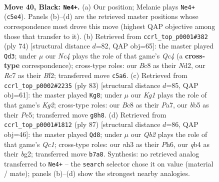 \documentclass[11pt]{article}
\begin{document}
\clearpage

\begin{figure}[p]\centering
\begin{subfigure}{0.46\textwidth}\centering
\resizebox{\linewidth}{!}{%
\newchessgame
\chessboard[
  setfen={2b3k1/1qr2p1p/6p1/1Bn1Pp2/pQ3P2/7N/P1P2KPP/1R6 b - - 17 40},
  showmover=false,
  pgfstyle=straightmove, color=movearrow, markmove={c5-e4}
]}
\caption{}
\end{subfigure}\hfill
\begin{subfigure}{0.46\textwidth}\centering
\resizebox{\linewidth}{!}{%
\newchessgame
\chessboard[
  setfen={6k1/3q1p2/p2brnp1/1p6/2QR4/P1P3P1/1P1N1BKP/8 w - - 0 38},
  showmover=false,
  pgfstyle=straightmove, color=movearrow, markmove={c4-d3}
]}
\caption{}
\end{subfigure}
\\[4pt]
\begin{subfigure}{0.46\textwidth}\centering
\resizebox{\linewidth}{!}{%
\newchessgame
\chessboard[
  setfen={8/p5k1/3qr1pp/2pNp3/1pPnR3/1P5P/P4PP1/4Q2K b - - 1 42},
  showmover=false,
  pgfstyle=straightmove, color=movearrow, markmove={g7-g8}
]}
\caption{}
\end{subfigure}\hfill
\begin{subfigure}{0.46\textwidth}\centering
\resizebox{\linewidth}{!}{%
\newchessgame
\chessboard[
  setfen={1rq3k1/5pp1/2p1b2p/R1Qn4/1p1P3P/1P4P1/3B1PB1/6K1 b - - 11 44},
  showmover=false,
  pgfstyle=straightmove, color=movearrow, markmove={c8-d8}
]}
\caption{}
\end{subfigure}
\caption{\textbf{Move 40, Black: \texttt{Ne4+}.} (a) Our position; Melanie plays \texttt{Ne4+} (\texttt{c5e4}). Panels (b)--(d) are the retrieved master positions whose correspondence most drove this move (highest QAP objective among those that transfer to it). (b) Retrieved from \texttt{ccrl\_top\_p0001\#382} (ply 74) [structural distance $d$=82, QAP obj=65]: the master played \texttt{Qd3}; under $\mu$ our \emph{Nc4} plays the role of that game's \emph{Qc4} (a \textbf{cross-type} correspondence); cross-type roles: our \emph{B}c8 as their \emph{N}d2, our \emph{R}c7 as their \emph{B}f2; transferred move \texttt{c5a6}. (c) Retrieved from \texttt{ccrl\_top\_p0002\#2235} (ply 83) [structural distance $d$=85, QAP obj=61]: the master played \texttt{Kg8}; under $\mu$ our \emph{Kg1} plays the role of that game's \emph{Kg2}; cross-type roles: our \emph{B}c8 as their \emph{P}a7, our \emph{b}b5 as their \emph{P}e5; transferred move \texttt{g8h8}. (d) Retrieved from \texttt{ccrl\_top\_p0001\#1812} (ply 87) [structural distance $d$=86, QAP obj=46]: the master played \texttt{Qd8}; under $\mu$ our \emph{Qb2} plays the role of that game's \emph{Qc1}; cross-type roles: our \emph{n}h3 as their \emph{P}h6, our \emph{q}b4 as their \emph{b}g2; transferred move \texttt{b7a8}. Synthesis: no retrieved analog transferred to \texttt{Ne4+} -- the \texttt{search} selector chose it on value (material / mate); panels (b)--(d) show the strongest nearby analogies.}
\label{fig:thought-m79}
\end{figure}
\end{document}
